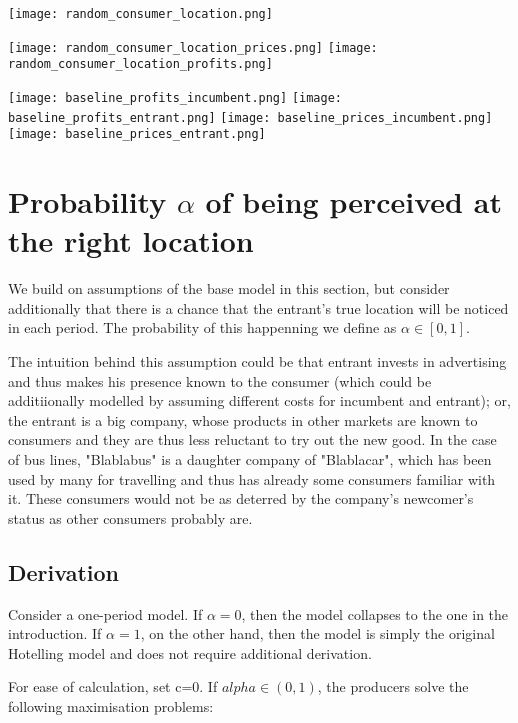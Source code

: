 \documentclass{article}
\begin{document}
\begin{center}
    \texttt{[image: random\_consumer\_location.png]}
\end{center}


\texttt{[image: random\_consumer\_location\_prices.png]}
\texttt{[image: random\_consumer\_location\_profits.png]}

\texttt{[image: baseline\_profits\_incumbent.png]}
\texttt{[image: baseline\_profits\_entrant.png]}
\texttt{[image: baseline\_prices\_incumbent.png]}\\
\texttt{[image: baseline\_prices\_entrant.png]}

\section{Probability $\alpha$ of being perceived at the right location}

We build on assumptions of the base model in this section, but consider additionally that there is a chance that the entrant's true location will be noticed in each period. The probability of this happenning we define as $\alpha \in [0,1]$. 

The intuition behind this assumption could be that entrant invests in advertising and thus makes his presence known to the consumer (which could be additiionally modelled by assuming different costs for incumbent and entrant); or, the entrant is a big company, whose products in other markets are known to consumers and they are thus less reluctant to try out the new good. In the case of bus lines, "Blablabus" is a daughter company of "Blablacar", which has been used by many for travelling and thus has already some consumers familiar with it. These consumers would not be as deterred by the company's newcomer's status as other consumers probably are.

\subsection{Derivation}

Consider a one-period model. If $\alpha = 0$, then the model collapses to the one in the introduction. If $\alpha = 1$, on the other hand, then the model is simply the original Hotelling model and does not require additional derivation. 

For ease of calculation, set c=0. If $alpha \in (0,1)$, the producers solve the following maximisation problems:
\end{document}
